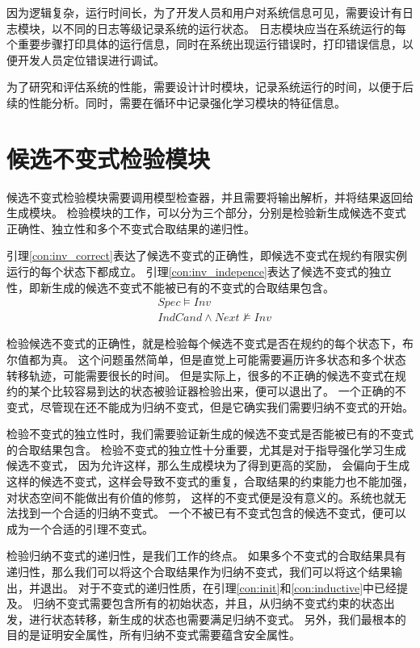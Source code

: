 因为逻辑复杂，运行时间长，为了开发人员和用户对系统信息可见，需要设计有日志模块，以不同的日志等级记录系统的运行状态。
日志模块应当在系统运行的每个重要步骤打印具体的运行信息，同时在系统出现运行错误时，打印错误信息，以便开发人员定位错误进行调试。

为了研究和评估系统的性能，需要设计计时模块，记录系统运行的时间，以便于后续的性能分析。同时，需要在循环中记录强化学习模块的特征信息。

\section{候选不变式检验模块}

候选不变式检验模块需要调用模型检查器，并且需要将输出解析，并将结果返回给生成模块。
检验模块的工作，可以分为三个部分，分别是检验新生成候选不变式正确性、独立性和多个不变式合取结果的递归性。

引理\ref{con:inv_correct}表达了候选不变式的正确性，即候选不变式在规约有限实例运行的每个状态下都成立。
引理\ref{con:inv_indepence}表达了候选不变式的独立性，即新生成的候选不变式不能被已有的不变式的合取结果包含。
\begin{align}
    &Spec \vDash Inv \label{con:inv_correct} \\
    &IndCand \wedge Next \nvDash Inv \label{con:inv_indepence}
\end{align}

检验候选不变式的正确性，就是检验每个候选不变式是否在规约的每个状态下，布尔值都为真。
这个问题虽然简单，但是直觉上可能需要遍历许多状态和多个状态转移轨迹，可能需要很长的时间。
但是实际上，很多的不正确的候选不变式在规约的某个比较容易到达的状态被验证器检验出来，便可以退出了。
一个正确的不变式，尽管现在还不能成为归纳不变式，但是它确实我们需要归纳不变式的开始。

检验不变式的独立性时，我们需要验证新生成的候选不变式是否能被已有的不变式的合取结果包含。
检验不变式的独立性十分重要，尤其是对于指导强化学习生成候选不变式，
因为允许这样，那么生成模块为了得到更高的奖励，
会偏向于生成这样的候选不变式，这样会导致不变式的重复，合取结果的约束能力也不能加强，对状态空间不能做出有价值的修剪，
这样的不变式便是没有意义的。系统也就无法找到一个合适的归纳不变式。
一个不被已有不变式包含的候选不变式，便可以成为一个合适的引理不变式。

检验归纳不变式的递归性，是我们工作的终点。
如果多个不变式的合取结果具有递归性，那么我们可以将这个合取结果作为归纳不变式，我们可以将这个结果输出，并退出。
对于不变式的递归性质，在引理\ref{con:init}和\ref{con:inductive}中已经提及。
归纳不变式需要包含所有的初始状态，并且，从归纳不变式约束的状态出发，进行状态转移，新生成的状态也需要满足归纳不变式。
另外，我们最根本的目的是证明安全属性，所有归纳不变式需要蕴含安全属性。

